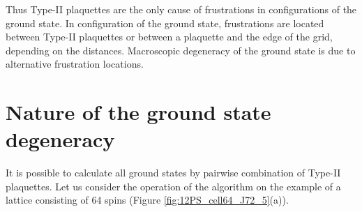 \documentclass[preprint,12pt]{elsarticle}
\begin{document}
	Thus Type-II plaquettes are the only cause of frustrations in configurations of the ground state. In configuration of the ground state, frustrations are located between Type-II plaquettes or between a plaquette and the edge of the grid, depending on the distances. Macroscopic degeneracy of the ground state is due to alternative frustration locations.
	
	\section{Nature of the ground state degeneracy}
	
	It is possible to calculate all ground states by pairwise combination of Type-II plaquettes. Let us consider the operation of the algorithm on the example of a lattice consisting of 64 spins (Figure \ref{fig:12PS_cell64_J72_5}(a)).
	
\end{document}
